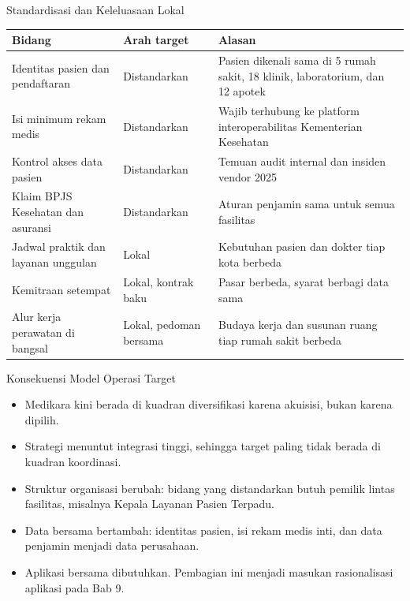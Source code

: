 \documentclass[aspectratio=169, table, 12pt]{beamer}
\begin{document}
\begin{frame}{{\Large Standardisasi dan Keleluasaan Lokal}}
  \scriptsize
  \begin{tabularx}{\textwidth}{>{\raggedright\arraybackslash}p{4.4cm}
      >{\raggedright\arraybackslash}p{2.5cm} >{\raggedright\arraybackslash}X}
    \hline
    \textbf{Bidang} & \textbf{Arah target} & \textbf{Alasan} \\
    \hline
    Identitas pasien dan pendaftaran & Distandarkan & Pasien dikenali sama di 5 rumah
      sakit, 18 klinik, laboratorium, dan 12 apotek \\
    \hline
    Isi minimum rekam medis & Distandarkan & Wajib terhubung ke platform interoperabilitas
      Kementerian Kesehatan \\
    \hline
    Kontrol akses data pasien & Distandarkan & Temuan audit internal dan insiden vendor 2025 \\
    \hline
    Klaim BPJS Kesehatan dan asuransi & Distandarkan & Aturan penjamin sama untuk semua
      fasilitas \\
    \hline
    Jadwal praktik dan layanan unggulan & Lokal & Kebutuhan pasien dan dokter tiap kota
      berbeda \\
    \hline
    Kemitraan setempat & Lokal, kontrak baku & Pasar berbeda, syarat berbagi data sama \\
    \hline
    Alur kerja perawatan di bangsal & Lokal, pedoman bersama & Budaya kerja dan susunan
      ruang tiap rumah sakit berbeda \\
    \hline
  \end{tabularx}
\end{frame}

\begin{frame}{{\Large Konsekuensi Model Operasi Target}}
  \vspace{6pt}
  \small
  \begin{itemize}
    \item Medikara kini berada di kuadran diversifikasi karena akuisisi, bukan karena dipilih.
    \item Strategi menuntut integrasi tinggi, sehingga target paling tidak berada di kuadran koordinasi.
    \item Struktur organisasi berubah: bidang yang distandarkan butuh pemilik lintas fasilitas, misalnya
          Kepala Layanan Pasien Terpadu.
    \item Data bersama bertambah: identitas pasien, isi rekam medis inti, dan data penjamin menjadi data
          perusahaan.
    \item Aplikasi bersama dibutuhkan. Pembagian ini menjadi masukan rasionalisasi aplikasi pada Bab 9.
  \end{itemize}
\end{frame}
\end{document}
